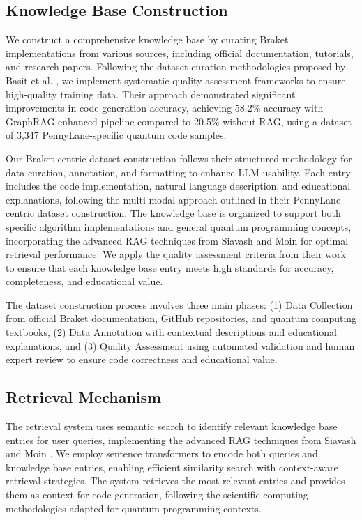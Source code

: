 \documentclass[runningheads]{llncs}
\begin{document}
\subsection{Knowledge Base Construction}
We construct a comprehensive knowledge base by curating Braket implementations from various sources, including official documentation, tutorials, and research papers. Following the dataset curation methodologies proposed by Basit et al. \cite{basit2025pennylangpioneeringllmbasedquantum}, we implement systematic quality assessment frameworks to ensure high-quality training data. Their approach demonstrated significant improvements in code generation accuracy, achieving 58.2\% accuracy with GraphRAG-enhanced pipeline compared to 20.5\% without RAG, using a dataset of 3,347 PennyLane-specific quantum code samples.

Our Braket-centric dataset construction follows their structured methodology for data curation, annotation, and formatting to enhance LLM usability. Each entry includes the code implementation, natural language description, and educational explanations, following the multi-modal approach outlined in their PennyLane-centric dataset construction. The knowledge base is organized to support both specific algorithm implementations and general quantum programming concepts, incorporating the advanced RAG techniques from Siavash and Moin \cite{siavash2025modeldrivenquantumcodegeneration} for optimal retrieval performance. We apply the quality assessment criteria from their work to ensure that each knowledge base entry meets high standards for accuracy, completeness, and educational value.

The dataset construction process involves three main phases: (1) Data Collection from official Braket documentation, GitHub repositories, and quantum computing textbooks, (2) Data Annotation with contextual descriptions and educational explanations, and (3) Quality Assessment using automated validation and human expert review to ensure code correctness and educational value.

\subsection{Retrieval Mechanism}
The retrieval system uses semantic search to identify relevant knowledge base entries for user queries, implementing the advanced RAG techniques from Siavash and Moin \cite{siavash2025modeldrivenquantumcodegeneration}. We employ sentence transformers to encode both queries and knowledge base entries, enabling efficient similarity search with context-aware retrieval strategies. The system retrieves the most relevant entries and provides them as context for code generation, following the scientific computing methodologies adapted for quantum programming contexts.
\end{document}
